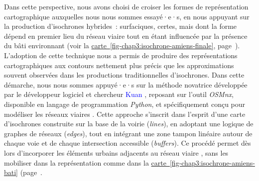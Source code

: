 \begin{refsegment}
Dans cette perspective, nous avons choisi de croiser les formes de représentation cartographique auxquelles nous nous sommes essayé·e·s, en nous appuyant sur la production d’isochrones hybrides~: surfaciques, certes, mais dont la forme dépend en premier lieu du réseau viaire tout en étant influencée par la présence du bâti environnant (voir la \hyperref[fig-chap3:isochrone-amiens-finale]{carte~\ref{fig-chap3:isochrone-amiens-finale}}, page~\pageref{fig-chap3:isochrone-amiens-finale}). L'adoption de cette technique nous a permis de produire des représentations cartographiques aux contours nettement plus précis que les approximations souvent observées dans les productions traditionnelles d’isochrones. Dans cette démarche, nous nous sommes appuyé·e·s sur la méthode novatrice développée par le développeur logiciel et chercheur \textcolor{blue}{Kuan} \textcolor{blue}{\textcite{butts_better_2017}}, reposant sur l’outil \textsl{OSMnx}, disponible en langage de programmation \textsl{Python}, et spécifiquement conçu pour modéliser les réseaux viaires \textcolor{blue}{\autocite[132]{boeing_osmnx_2017}}. Cette approche s’inscrit dans l’esprit d’une carte d’isochrones construite sur la base de la voirie (\textsl{lines}), en adoptant une logique de graphes de réseaux (\textsl{edges}), tout en intégrant une zone tampon linéaire autour de chaque voie et de chaque intersection accessible (\textsl{buffers}). Ce procédé permet dès lors d’incorporer les éléments urbains adjacents au réseau viaire \textcolor{blue}{\autocite[135]{boeing_osmnx_2017}}, sans les mobiliser dans la représentation comme dans la \hyperref[fig-chap3:isochrone-amiens-bati]{carte~\ref{fig-chap3:isochrone-amiens-bati}} (page~\pageref{fig-chap3:isochrone-amiens-bati}.%


\end{refsegment}
